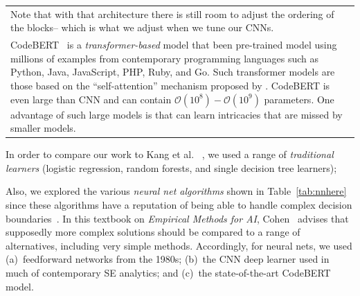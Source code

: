 \begin{table}[!b]
\begin{tabular}{p{8.5cm}}
Note that with that architecture there is
still room to adjust the ordering of the blocks-- which is what we adjust when we tune our CNNs.\\   \rowcolor{gray!15} 
CodeBERT~\cite{feng2020codebert} is a {\em transformer-based}  model that been   pre-trained model using millions of examples
 from contemporary programming languages such as Python, Java, JavaScript, PHP, Ruby, and Go. 
Such transformer models
are those based on the ``self-attention'' mechanism proposed by \citet{vaswani2017attention}. CodeBERT
        is even large than CNN and can contain $\mathcal{O}(10^8)-\mathcal{O}(10^9)$ parameters.
One advantage of such large models is that can 
 learn intricacies that are missed by smaller models.   \\\bottomrule
    \end{tabular}
\end{table}    
 \item
   In order to   compare our   work to    Kang et al. ~\cite{yang2021learning}, we used 
  a range of  {\em traditional learners}
  (logistic regression, random forests, and single
 decision tree learners); 
 \item
Also, we explored the various  {\em    neural net algorithms}
shown in  Table~\ref{tab:nnhere}
since these algorithms have a reputation
 of being able to handle complex decision boundaries~\cite{WittenFH11}. 
 In this textbook on {\em Empirical
     Methods for AI}, Cohen~\cite{cohen1995empirical} advises that supposedly more complex solutions should be compared to  a range of alternatives, including very
     simple methods. Accordingly, for neural nets,
     we used (a)~feedforward networks from the 1980s;
     (b)~the CNN deep learner used in much of contemporary SE
     analytics; and (c)~the state-of-the-art   CodeBERT model.
 \ei     
